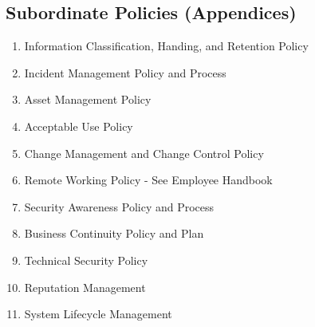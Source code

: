 \documentclass[../main.tex]{subfiles}
\begin{document}
  \subsection{Subordinate Policies (Appendices)}
  \begin{enumerate}
    \renewcommand{\labelenumi}{\Alph{enumi}.}
    \item Information Classification, Handing, and Retention Policy
    \item Incident Management Policy and Process
    \item Asset Management Policy
    \item Acceptable Use Policy
    \item Change Management and Change Control Policy
    \item Remote Working Policy - See Employee Handbook
    \item Security Awareness Policy and Process
    \item Business Continuity Policy and Plan
    \item Technical Security Policy
    \item Reputation Management
    \item System Lifecycle Management
  \end{enumerate}
\end{document}
